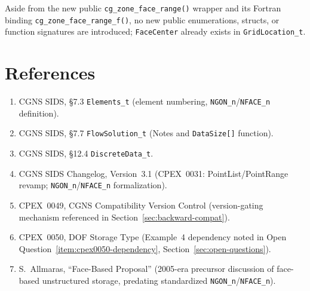 \documentclass[11pt,letterpaper]{article}
\begin{document}
Aside from the new public \texttt{cg\_zone\_face\_range()} wrapper and
its Fortran binding \texttt{cg\_zone\_face\_range\_f()}, no new public
enumerations, structs, or function signatures are introduced;
\texttt{FaceCenter} already exists in \texttt{GridLocation\_t}.

\section{References}

\begin{enumerate}[leftmargin=2em]
\item CGNS SIDS, \S7.3 \texttt{Elements\_t} (element numbering, \texttt{NGON\_n}/\texttt{NFACE\_n} definition).
\item CGNS SIDS, \S7.7 \texttt{FlowSolution\_t} (Notes and \texttt{DataSize[]} function).
\item CGNS SIDS, \S12.4 \texttt{DiscreteData\_t}.
\item CGNS SIDS Changelog, Version~3.1 (CPEX~0031: PointList/PointRange revamp; \texttt{NGON\_n}/\texttt{NFACE\_n} formalization).
\item CPEX~0049, CGNS Compatibility Version Control (version-gating mechanism referenced in Section~\ref{sec:backward-compat}).
\item CPEX~0050, DOF Storage Type (Example~4 dependency noted in Open Question~\ref{item:cpex0050-dependency}, Section~\ref{sec:open-questions}).
\item S.~Allmaras, ``Face-Based Proposal'' (2005-era precursor discussion of face-based unstructured storage, predating standardized \texttt{NGON\_n}/\texttt{NFACE\_n}).
\end{enumerate}
\end{document}
